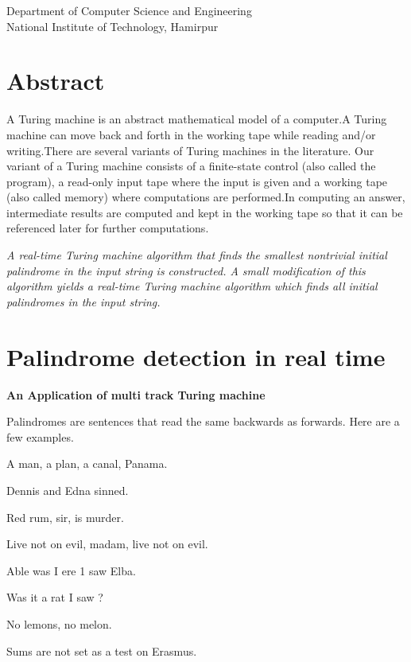 \documentclass[11pt,a4paper]{report}
\begin{document}
\begin{titlepage}
\begin{center}
        \vspace{25pt}
        
        \large
 
        Department of Computer Science and  Engineering\\
        National Institute of Technology, Hamirpur\\
      
    \end{center}
\end{titlepage}


\chapter*{Abstract}

A Turing machine is an abstract mathematical model of a computer.A Turing machine can move back and forth in the working tape while reading and/or writing.There are several variants of Turing machines in the literature. Our variant of a Turing machine consists of a finite-state control (also called the program), a read-only input tape where the input is given and a working tape (also called memory) where computations are performed.In computing an answer, intermediate results are computed and kept in the working tape so that it can be referenced later for further computations.

\vspace{5pt}
\textit{A real-time Turing machine algorithm that finds the smallest nontrivial initial palindrome in the input string is constructed. A small modification of this algorithm yields
a real-time Turing machine algorithm which finds all initial palindromes in the input
string. 
}


\pagestyle{plain}


\pagebreak

\tableofcontents

\chapter{Palindrome detection in real time}
\begin{center}
    

\textbf{An Application of multi track Turing machine}
\end{center}
Palindromes are sentences that read the same backwards as forwards. Here are a few
examples.

\begin{center}
    
A man, a plan, a canal, Panama.

Dennis and Edna sinned.

Red rum, sir, is murder.

Live not on evil, madam, live not on evil.

Able was I ere 1 saw Elba.

Was it a rat I saw ?

No lemons, no melon.

Sums are not set as a test on Erasmus.
\end{center}
\end{document}

